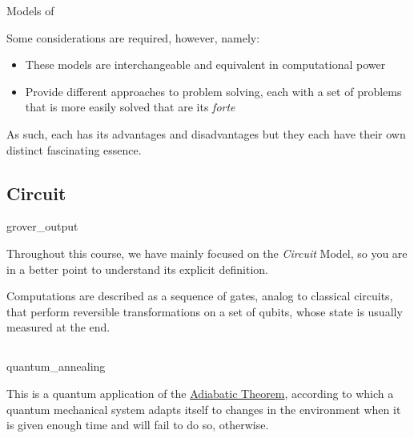 \documentclass[aspectratio=43]{beamer}
\begin{document}
\begin{frame}{Models of \qcp}
    \begin{card}
        Some considerations are required, however, namely:
        \begin{itemize}
            \item These models are interchangeable and equivalent in computational power
            \item Provide different approaches to problem solving, each with a set of problems that is more easily solved that are its \textit{forte}
        \end{itemize}
        As such, each has its advantages and disadvantages but they each have their own distinct fascinating essence.
    \end{card}
\pagenumber
\end{frame}



\subsection{\q Circuit}
\begin{frameImg}[height]{grover_output}
    \begin{card}[\q Circuit]
        Throughout this course, we have mainly focused on the \textit{\q Circuit} Model, so you are in a better point to understand its explicit definition.
    \end{card}
    \begin{card}
        Computations are described as a sequence of gates, analog to classical circuits, that perform reversible transformations on a set of qubits, whose state is usually measured at the end.
    \end{card}
\pagenumber
\end{frameImg}


\subsection{\aqc}
\begin{frameImg}[height]{quantum_annealing}
    \begin{card}[\aqc]
        This is a quantum application of the \href{https://en.wikipedia.org/wiki/Adiabatic_theorem}{Adiabatic Theorem}, according to which a quantum mechanical system adapts itself to changes in the environment when it is given enough time and will fail to do so, otherwise.
    \end{card}
\pagenumber
\end{frameImg}
\end{document}
